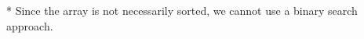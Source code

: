 \documentclass[preview]{standalone}
\begin{document}
* Since the array is not necessarily sorted, we cannot use a binary search approach.\\
\end{document}
